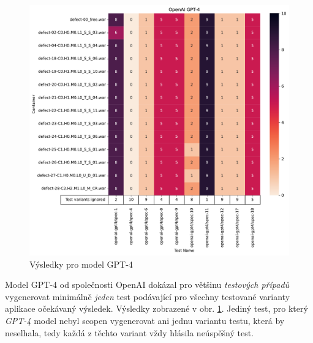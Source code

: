 \documentclass[czech, ma, kiv, he, iso690alph, pdf, viewonly]{fasthesis}
\begin{document}
            \begin{figure}
                \includegraphics[width=\textwidth]{pic/gpt-4-results.pdf}
                \caption{Výsledky pro model GPT-4}
                \label{fig:res:gpt-4}
            \end{figure}

            Model GPT-4 od společnosti OpenAI dokázal pro většinu \textit{testových případů} vygenerovat minimálně \emph{jeden} test podávající pro všechny testované varianty aplikace očekávaný výsledek. Výsledky zobrazené v obr. \ref{fig:res:gpt-4}. Jediný test, pro který \textit{GPT-4} model nebyl scopen vygenerovat ani jednu variantu testu, která by neselhala, tedy každá z těchto variant vždy hlásila neúspěšný test.
\end{document}
